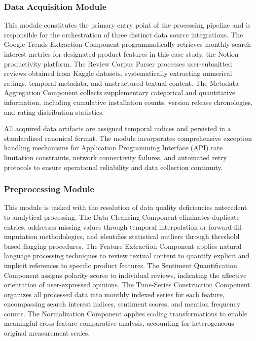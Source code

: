 \subsubsection{Data Acquisition Module}
This module constitutes the primary entry point of the processing pipeline and is responsible for the orchestration of three distinct data source integrations. The Google Trends Extraction Component programmatically retrieves monthly search interest metrics for designated product features in this case study, the Notion productivity platform. The Review Corpus Parser processes user-submitted reviews obtained from Kaggle datasets, systematically extracting numerical ratings, temporal metadata, and unstructured textual content. The Metadata Aggregation Component collects supplementary categorical and quantitative information, including cumulative installation counts, version release chronologies, and rating distribution statistics.

All acquired data artifacts are assigned temporal indices and persisted in a standardized canonical format. The module incorporates comprehensive exception handling mechanisms for Application Programming Interface (API) rate limitation constraints, network connectivity failures, and automated retry protocols to ensure operational reliability and data collection continuity.

\subsubsection{Preprocessing Module}
This module is tasked with the resolution of data quality deficiencies antecedent to analytical processing. The Data Cleansing Component eliminates duplicate entries, addresses missing values through temporal interpolation or forward-fill imputation methodologies, and identifies statistical outliers through threshold based flagging procedures. The Feature Extraction Component applies natural language processing techniques to review textual content to quantify explicit and implicit references to specific product features. The Sentiment Quantification Component assigns polarity scores to individual reviews, indicating the affective orientation of user-expressed opinions. The Time-Series Construction Component organizes all processed data into monthly indexed series for each feature, encompassing search interest indices, sentiment scores, and mention frequency counts. The Normalization Component applies scaling transformations to enable meaningful cross-feature comparative analysis, accounting for heterogeneous original measurement scales.

